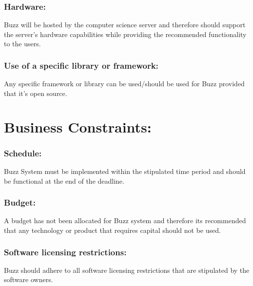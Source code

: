 \documentclass[11pt]{article}
\begin{document}
			\subsubsection{Hardware:}
			
			
			\textbf{}Buzz will be hosted by the computer science server and therefore should support the server’s hardware capabilities while providing the recommended functionality to the users.
			
			\subsubsection{Use of a specific library or framework:}
			
			
			\textbf{}Any specific framework or library can be used/should be used for Buzz provided that it’s open source.
	
			\section{ Business Constraints:}
				\subsubsection{Schedule:}
				
				
				\textbf{}Buzz System must be implemented within the stipulated time period and should be functional at the end of the deadline.
					\subsubsection{Budget:}
					
					
					\textbf{}A budget has not been allocated for Buzz system and therefore its recommended that any technology or product that requires capital should not be used.
						\subsubsection{Software licensing restrictions:}
						
						
						\textbf{}Buzz should adhere to all software licensing restrictions that are stipulated by the software owners.
\end{document}
